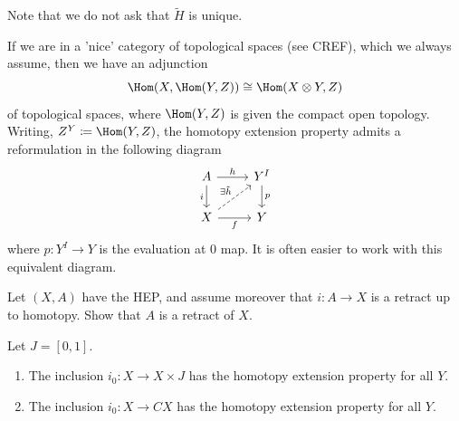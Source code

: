 \documentclass[ma3408.tex]{subfiles}
\begin{document}
\begin{Rem}
Note that we do not ask that $\tilde H$ is unique. 
\end{Rem}
\begin{Rem}\label{Rem:hep_adjoint}
If we are in a 'nice' category of topological spaces (see CREF), which we always assume, then we have an adjunction
\[
\Hom(X,\Hom(Y,Z)) \cong \Hom(X \otimes Y,Z)
\]
of topological spaces, where $\Hom(Y,Z)$ is given the compact open topology. Writing, $Z^Y \coloneqq \Hom(Y,Z)$, the homotopy extension property admits a reformulation in the following diagram
\[\begin{tikzcd}
	A & {Y^I} \\
	X & Y
	\arrow["h", from=1-1, to=1-2]
	\arrow["i"', from=1-1, to=2-1]
	\arrow["f"', from=2-1, to=2-2]
	\arrow["p", from=1-2, to=2-2]
	\arrow["{\exists \tilde h}", dashed, from=2-1, to=1-2]
\end{tikzcd}\]
where $p \colon Y^I \to Y$ is the evaluation at 0 map. It is often easier to work with this equivalent diagram. 
\end{Rem}
\begin{exercise}{}{}
Let $(X,A)$ have the HEP, and assume moreover that $i \colon A \to X$ is a retract up to homotopy. Show that $A$ is a retract of $X$. 
\end{exercise}
\begin{Lem}
	Let $J = [0,1]$. 
	\begin{enumerate}[label=(\roman*)]
		\item The inclusion $i_0 \colon X \to X \times J$ has the homotopy extension property for all $Y$. 
		\item The inclusion $i_0 \colon X \to CX$ has the homotopy extension property for all $Y$.   
	\end{enumerate}
\end{Lem}
\end{document}
